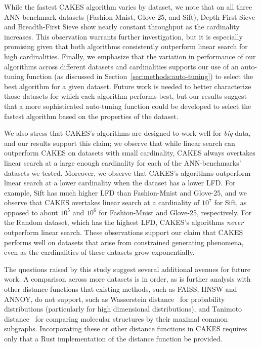 While the fastest CAKES algorithm varies by dataset, we note that on all three ANN-benchmark datasets (Fashion-Mnist, Glove-25, and Sift), Depth-First Sieve and Breadth-First Sieve show nearly constant throughput as the cardinality increases.
This observation warrants further investigation, but it is especially promising given that both algorithms consistently outperform linear search for high cardinalities.
Finally, we emphasize that the variation in performance of our algorithms across different datasets and cardinalities supports our use of an auto-tuning function (as discussed in Section~\ref{sec:methods:auto-tuning}) to select the best algorithm for a given dataset.
Future work is needed to better characterize those datasets for which each algorithm performs best, but our results suggest that a more sophisticated auto-tuning function could be developed to select the fastest algorithm based on the properties of the dataset.

We also stress that CAKES's algorithms are designed to work well for \textit{big} data, and our results support this claim;
we observe that while linear search can outperform CAKES on datasets with small cardinality, CAKES always overtakes linear search at a large enough cardinality for each of the ANN-benchmarks' datasets we tested.
Moreover, we observe that CAKES's algorithms outperform linear search at a lower cardinality when the dataset has a lower LFD.
For example, Sift has much higher LFD than Fashion-Mnist and Glove-25, and we observe that CAKES overtakes linear search at a cardinality of $10^7$ for Sift, as opposed to about $10^5$ and $10^6$ for Fashion-Mnist and Glove-25, respectively.
For the Random dataset, which has the highest LFD, CAKES's algorithms \textit{never} outperform linear search.
These observations support our claim that CAKES performs well on datasets that arise from constrained generating phenomena, even as the cardinalities of these datasets grow exponentially.

The questions raised by this study suggest several additional avenues for future work.
A comparison across more datasets is in order, as is further analysis with other distance functions that existing methods, such as FAISS, HNSW and ANNOY, do not support, such as Wasserstein distance~\cite{vallender1974calculation} for probability distributions (particularly for high dimensional distributions), and Tanimoto distance~\cite{bajusz2015tanimoto} for comparing molecular structures by their maximal common subgraphs.
Incorporating these or other distance functions in CAKES requires only that a Rust implementation of the distance function be provided.

